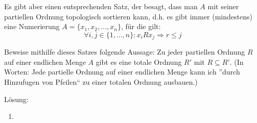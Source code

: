 \documentclass[main.tex]{subfiles}
\begin{document}
\begin{enumerate}
	      Es gibt aber einen entsprechenden Satz, der besagt, dass man \( A \) mit seiner
	      partiellen Ordnung topologisch sortieren kann, d.h. es gibt immer (mindestens)
	      eine Numerierung \( A = \{ x_1, x_2, \dots, x_n \} \), für die gilt:
	      \[ \forall i, j \in \{ 1, \dots, n\} : x_iRx_j \Rightarrow r \leq j \]

	      Beweise mithilfe dieses Satzes folgende Aussage: Zu jeder partiellen Ordnung
	      \( R \) auf einer endlichen Menge \( A \) gibt es eine totale Ordnung \( R' \)
	      mit \( R \subseteq R' \). (In Worten:
	      Jede partielle Ordnung auf einer endlichen Menge kann ich ”durch
	      Hinzufugen von Pfeilen“ zu einer totalen Ordnung ausbauen.)

	      Lösung:
	      \begin{enumerate}
		      \item
	      \end{enumerate}
\end{enumerate}
\end{document}
